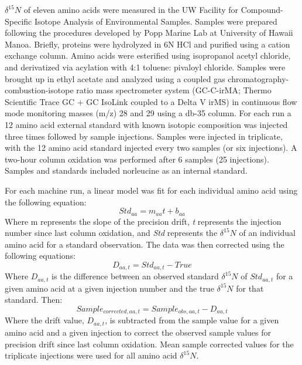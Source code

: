 \documentclass [11pt, proquest] {uwthesis}[2015/03/03]
\begin{document}
\(\delta^{15}N\) of eleven amino acids were measured in the UW Facility
for Compound-Specific Isotope Analysis of Environmental Samples. Samples
were prepared following the procedures developed by Popp Marine Lab at
University of Hawaii Manoa. Briefly, proteins were hydrolyzed in 6N HCl
and purified using a cation exchange column. Amino acids were esterified
using isopropanol acetyl chloride, and derivatized via acylation with
4:1 toluene: pivaloyl chloride. Samples were brought up in ethyl acetate
and analyzed using a coupled gas chromatography-combustion-isotope ratio
mass spectrometer system (GC-C-irMA; Thermo Scientific Trace GC + GC
IsoLink coupled to a Delta V irMS) in continuous flow mode monitoring
masses (m/z) 28 and 29 using a db-35 column. For each run a 12 amino
acid external standard with known isotopic composition was injected
three times followed by sample injections. Samples were injected in
triplicate, with the 12 amino acid standard injected every two samples
(or six injections). A two-hour column oxidation was performed after 6
samples (25 injections). Samples and standards included norleucine as an
internal standard.

For each machine run, a linear model was fit for each individual amino
acid using the following equation:
\begin{equation} 
  Std_{aa} = m_{aa}t + b_{aa}
  \label{eq:std}
\end{equation}
Where m represents the slope of the precision drift, \emph{t} represents
the injection number since last column oxidation, and \emph{Std}
represents the \(\delta^{15}N\) of an individual amino acid for a
standard observation. The data was then corrected using the following
equations:
\begin{equation} 
  D_{aa, t} = Std_{aa,t} - True
  \label{eq:diff}
\end{equation}
Where \(D_{aa,t}\) is the difference between an observed standard
\(\delta^{15}N\) of \(Std_{aa,t}\) for a given amino acid at a given
injection number and the true \(\delta^{15}N\) for that standard. Then:
\begin{equation} 
  Sample_{corrected,aa,t} = Sample_{obs,aa,t} - D_{aa,t}
  \label{eq:sampcorr}
\end{equation}
Where the drift value, \(D_{aa,t}\), is subtracted from the sample value
for a given amino acid and a given injection to correct the observed
sample values for precision drift since last column oxidation. Mean
sample corrected values for the triplicate injections were used for all
amino acid \(\delta^{15}N\).
\end{document}
